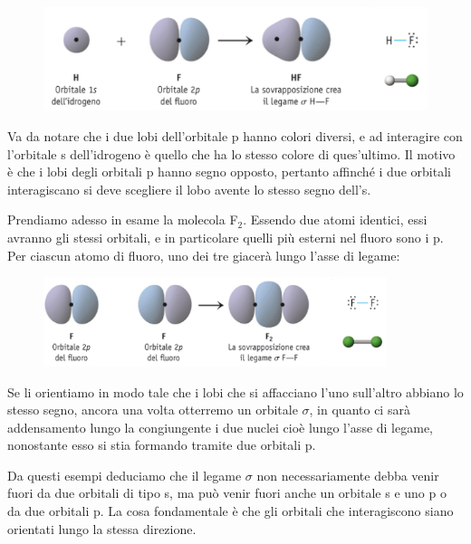 \vspace{-0.4cm}\begin{figure}[H]
    \centering
    \includegraphics[width=12cm]{immagini/legame_H-F.png}
\end{figure}

\vspace{-0.5cm}Va da notare che i due lobi dell'orbitale p hanno colori diversi, e ad interagire con l'orbitale s dell'idrogeno è quello che ha lo stesso colore di ques'ultimo. Il motivo è che i lobi degli orbitali p hanno segno opposto, pertanto affinché i due orbitali interagiscano si deve scegliere il lobo avente lo stesso segno dell's.

\vspace{0.2cm} Prendiamo adesso in esame la molecola F$_2$. Essendo due atomi identici, essi avranno gli stessi orbitali, e in particolare quelli più esterni nel fluoro sono i p. Per ciascun atomo di fluoro, uno dei tre giacerà lungo l'asse di legame:

\vspace{-0.4cm}\begin{figure}[H]
    \centering
    \includegraphics[width=10cm]{immagini/legame-F_2.png}
\end{figure}

\vspace{-0.5cm}Se li orientiamo in modo tale che i lobi che si affacciano l'uno sull'altro abbiano lo stesso segno, ancora una volta otterremo un orbitale $\sigma$, in quanto ci sarà addensamento lungo la congiungente i due nuclei cioè lungo l'asse di legame, nonostante esso si stia formando tramite due orbitali p.

\vspace{0.2cm} Da questi esempi deduciamo che il legame $\sigma$ non necessariamente debba venir fuori da due orbitali di tipo s, ma può venir fuori anche un orbitale s e uno p o da due orbitali p. La cosa fondamentale è che gli orbitali che interagiscono siano orientati lungo la stessa direzione.
